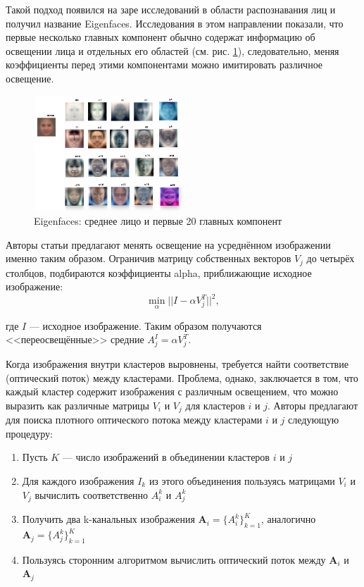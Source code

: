 Такой подход появился на заре исследований в области распознавания лиц и получил название Eigenfaces. Исследования в этом направлении показали, что первые несколько главных компонент обычно содержат информацию об освещении лица и отдельных его областей (см. рис. \ref{fig:eigenfaces}), следовательно, меняя коэффициенты перед этими компонентами можно имитировать различное освещение.

\begin{figure}[t]
	\centering
	\includegraphics[width=0.5\textwidth]{results/eigenfaces3.png}
	\caption{Eigenfaces: среднее лицо и первые 20 главных компонент}
	\label{fig:eigenfaces}
\end{figure}

Авторы статьи предлагают менять освещение на усреднённом изображении именно таким образом. Ограничив матрицу собственных векторов $ V_j $ до четырёх столбцов, подбираются коэффициенты alpha, приближающие исходное изображение:
$$
\min_{\alpha} || I - \alpha V^T_j || ^2,
$$

где $ I $ --- исходное изображение. Таким образом получаются <<переосвещённые>> средние
 $ A_j^I = \alpha V_j^T $.

Когда изображения внутри кластеров выровнены, требуется найти соответствие (оптический поток) между кластерами. Проблема, однако, заключается в том, что каждый кластер содержит изображения с различным освещением, что можно выразить как различные матрицы $ V_i $ и $ V_j $ для кластеров $ i $ и $j$. Авторы предлагают для поиска плотного оптического потока между кластерами $i$ и $j$ следующую процедуру:

\begin{enumerate}
    \item Пусть $K$ --- число изображений в объединении кластеров $i$ и $j$
    \item Для каждого изображения $ I_k $ из этого объединения пользуясь матрицами $ V_i $ и $ V_j $ вычислить соответственно $ A_i^k $ и $  A_j^k $
    \item Получить два k-канальных изображения $ \textbf{A}_i = \lbrace A_i^k\rbrace_{k=1}^K $, аналогично $ \textbf{A}_j = \lbrace A_j^k \rbrace_{k=1}^K $
    \item Пользуясь сторонним алгоритмом вычислить оптический поток между $ \textbf{A}_i $ и $ \textbf{A}_j$
\end{enumerate}

